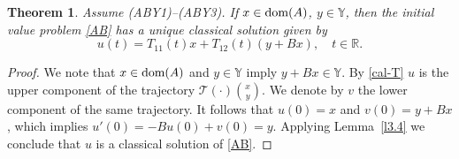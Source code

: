 \documentclass[11pt]{amsart}
\numberwithin{equation}{section}
\newtheorem{theorem}{Theorem}[section]
\theoremstyle{remark}
\theoremstyle{definition}
\newcommand\cT{{\mathcal T}}
\newcommand\bY{{\mathbb Y}}
\newcommand{\dom}{\text{\rm{dom}}}
\begin{document}
\begin{theorem}\label{t3.1}
	Assume \textnormal{(ABY1)--(ABY3)}. If $x \in \dom(A)$, $y \in \bY$, then the initial value problem \eqref{AB} 
	has a unique classical solution given by
	\begin{equation}\label{classical-solution}
		u(t) = T_{11}(t)x + T_{12}(t)(y+Bx), \quad t \in \mathbb{R}.
	\end{equation}
\end{theorem}
\begin{proof}
We note that $x \in \dom(A)$ and $y\in\bY$ imply  $y+Bx\in\bY$. By \eqref{cal-T} $u$ is the upper component of the trajectory $\cT(\cdot)\binom{x}{y}$. We denote by $v$ the lower component of the same trajectory. It follows that $u(0)=x$ and $v(0)=y+Bx$, which implies $ u'(0) = -Bu(0) + v(0) =y$. Applying Lemma~\ref{l3.4} we conclude that $u$ is a classical solution of \eqref{AB}. 
	

\end{proof}
\end{document}
